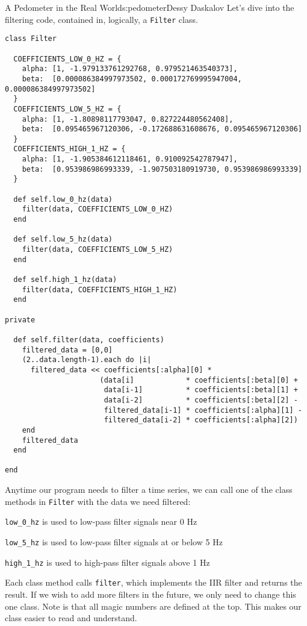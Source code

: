 \begin{aosachapter}{A Pedometer in the Real World}{s:pedometer}{Dessy Daskalov}
Let's dive into the filtering code, contained in, logically, a
\texttt{Filter} class.

\begin{verbatim}
class Filter

  COEFFICIENTS_LOW_0_HZ = {
    alpha: [1, -1.979133761292768, 0.979521463540373],
    beta:  [0.000086384997973502, 0.000172769995947004, 0.000086384997973502]
  }
  COEFFICIENTS_LOW_5_HZ = {
    alpha: [1, -1.80898117793047, 0.827224480562408],
    beta:  [0.095465967120306, -0.172688631608676, 0.095465967120306]
  }
  COEFFICIENTS_HIGH_1_HZ = {
    alpha: [1, -1.905384612118461, 0.910092542787947],
    beta:  [0.953986986993339, -1.907503180919730, 0.953986986993339]
  }

  def self.low_0_hz(data)
    filter(data, COEFFICIENTS_LOW_0_HZ)
  end

  def self.low_5_hz(data)
    filter(data, COEFFICIENTS_LOW_5_HZ)
  end

  def self.high_1_hz(data)
    filter(data, COEFFICIENTS_HIGH_1_HZ)
  end

private

  def self.filter(data, coefficients)
    filtered_data = [0,0]
    (2..data.length-1).each do |i|
      filtered_data << coefficients[:alpha][0] *
                      (data[i]            * coefficients[:beta][0] +
                       data[i-1]          * coefficients[:beta][1] +
                       data[i-2]          * coefficients[:beta][2] -
                       filtered_data[i-1] * coefficients[:alpha][1] -
                       filtered_data[i-2] * coefficients[:alpha][2])
    end
    filtered_data
  end

end
\end{verbatim}

Anytime our program needs to filter a time series, we can call one of
the class methods in \texttt{Filter} with the data we need filtered:

\begin{aosaitemize}

\item
  \texttt{low\_0\_hz} is used to low-pass filter signals near 0 Hz
\item
  \texttt{low\_5\_hz} is used to low-pass filter signals at or below 5
  Hz
\item
  \texttt{high\_1\_hz} is used to high-pass filter signals above 1 Hz
\end{aosaitemize}

Each class method calls \texttt{filter}, which implements the IIR filter
and returns the result. If we wish to add more filters in the future, we
only need to change this one class. Note is that all magic numbers are
defined at the top. This makes our class easier to read and understand.


\end{aosachapter}
